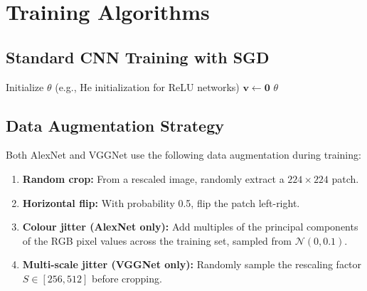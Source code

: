 \documentclass[12pt,a4paper]{article}
\begin{document}
\section{Training Algorithms}
\label{sec:algorithms}

\subsection{Standard CNN Training with SGD}

\begin{algorithm}[H]
\caption{Stochastic Gradient Descent Training for CNN Classification}
\label{alg:sgd_cnn}
\SetAlgoLined
\DontPrintSemicolon
{}
Initialize $\theta$ (e.g., He initialization for ReLU networks)\;
$\mathbf{v} \leftarrow \mathbf{0}$ 
\Return $\theta$\;
\end{algorithm}

\subsection{Data Augmentation Strategy}

Both AlexNet and VGGNet use the following data augmentation during training:
\begin{enumerate}[leftmargin=2em]
  \item \textbf{Random crop:} From a rescaled image, randomly extract a $224\times224$ patch.
  \item \textbf{Horizontal flip:} With probability 0.5, flip the patch left-right.
  \item \textbf{Colour jitter (AlexNet only):} Add multiples of the principal components of the RGB pixel values across the training set, sampled from $\mathcal{N}(0, 0.1)$.
  \item \textbf{Multi-scale jitter (VGGNet only):} Randomly sample the rescaling factor $S \in [256, 512]$ before cropping.
\end{enumerate}
\end{document}
